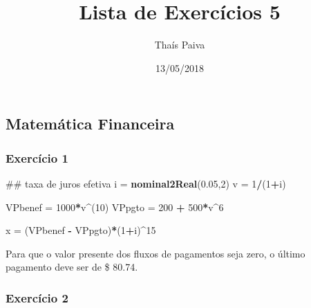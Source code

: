 \documentclass[]{article}
\title{Lista de Exercícios 5}
\author{Thaís Paiva}
\date{13/05/2018}
\newenvironment{Shaded}{\begin{snugshade}}{\end{snugshade}}
\newcommand{\ControlFlowTok}[1]{\textcolor[rgb]{0.13,0.29,0.53}{\textbf{#1}}}
\newcommand{\DataTypeTok}[1]{\textcolor[rgb]{0.13,0.29,0.53}{#1}}
\newcommand{\DecValTok}[1]{\textcolor[rgb]{0.00,0.00,0.81}{#1}}
\newcommand{\FloatTok}[1]{\textcolor[rgb]{0.00,0.00,0.81}{#1}}
\newcommand{\KeywordTok}[1]{\textcolor[rgb]{0.13,0.29,0.53}{\textbf{#1}}}
\newcommand{\NormalTok}[1]{#1}
\newcommand{\OperatorTok}[1]{\textcolor[rgb]{0.81,0.36,0.00}{\textbf{#1}}}
\newcommand{\StringTok}[1]{\textcolor[rgb]{0.31,0.60,0.02}{#1}}
\begin{document}
\maketitle

\hypertarget{matematica-financeira}{%
\subsection{Matemática Financeira}\label{matematica-financeira}}

\hypertarget{exercicio-1}{%
\subsubsection{Exercício 1}\label{exercicio-1}}

\begin{Shaded}
\begin{Highlighting}[]
\NormalTok{## taxa de juros efetiva}
\NormalTok{i =}\StringTok{ }\KeywordTok{nominal2Real}\NormalTok{(}\FloatTok{0.05}\NormalTok{,}\DecValTok{2}\NormalTok{)}
\NormalTok{v =}\StringTok{ }\DecValTok{1}\OperatorTok{/}\NormalTok{(}\DecValTok{1}\OperatorTok{+}\NormalTok{i)}

\NormalTok{VPbenef =}\StringTok{ }\DecValTok{1000}\OperatorTok{*}\NormalTok{v}\OperatorTok{^}\NormalTok{(}\DecValTok{10}\NormalTok{)}
\NormalTok{VPpgto =}\StringTok{ }\DecValTok{200} \OperatorTok{+}\StringTok{ }\DecValTok{500}\OperatorTok{*}\NormalTok{v}\OperatorTok{^}\DecValTok{6}

\NormalTok{x =}\StringTok{ }\NormalTok{(VPbenef }\OperatorTok{-}\StringTok{ }\NormalTok{VPpgto)}\OperatorTok{*}\NormalTok{(}\DecValTok{1}\OperatorTok{+}\NormalTok{i)}\OperatorTok{^}\DecValTok{15}
\end{Highlighting}
\end{Shaded}

Para que o valor presente dos fluxos de pagamentos seja zero, o último
pagamento deve ser de \$ 80.74.

\hypertarget{exercicio-2}{%
\subsubsection{Exercício 2}\label{exercicio-2}}

\begin{Shaded}
\end{Shaded}
\end{document}
